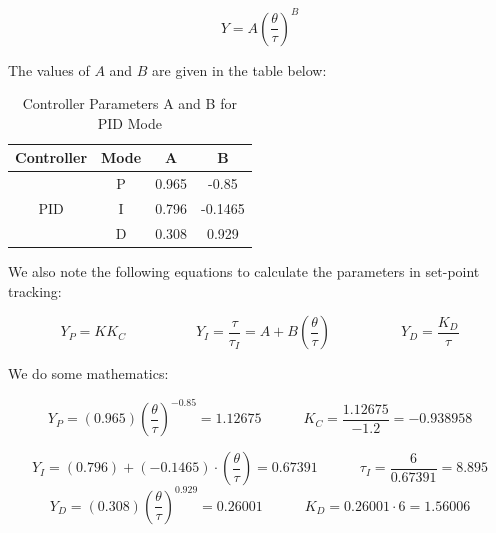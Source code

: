 \documentclass[12pt]{article}
\begin{document}
\begin{enumerate}
\begin{enumerate}
    \[
      Y = A\left(\frac{\theta}{\tau}\right)^B
    \]

    The values of \( A \) and \( B \) are given in the table below:

    \begin{table}[H]
      \centering
      \begin{tabular}{|c|c|c|c|}
      \hline
      \textbf{Controller} & \textbf{Mode} & \textbf{A} & \textbf{B} \\
      \hline
      \multirow{3}{*}{PID} & P & 0.965 & -0.85 \\
                           & I & 0.796 & -0.1465 \\
                           & D & 0.308 &  0.929 \\
      \hline
      \end{tabular}
      \caption{Controller Parameters A and B for PID Mode}
    \end{table}

    We also note the following equations to calculate the parameters in set-point tracking:

    \[
    Y_P = KK_C \quad \quad \quad \quad \quad
    Y_I = \frac{\tau}{\tau_I} = A + B \left( \frac{\theta}{\tau} \right) \quad \quad \quad \quad \quad
    Y_D = \frac{K_D}{\tau}
    \]

    We do some mathematics:

    $$
      Y_P = \left(0.965\right)\left(\frac{\theta}{\tau}\right)^{-0.85} = 1.12675 \quad \quad \quad 
      K_C = \frac{1.12675}{-1.2} = -0.938958
    $$

    $$
      Y_I = \left(0.796\right) + \left(-0.1465\right) \cdot \left(\frac{\theta}{\tau}\right) = 0.67391 \quad \quad \quad 
      \tau_I = \frac{6}{0.67391} = 8.895
    $$
    $$
      Y_D = \left(0.308\right)\left(\frac{\theta}{\tau}\right)^{0.929} = 0.26001 \quad \quad \quad 
      K_D = 0.26001 \cdot 6 = 1.56006
    $$






      


    

  \end{enumerate}

\end{enumerate}
\end{document}
